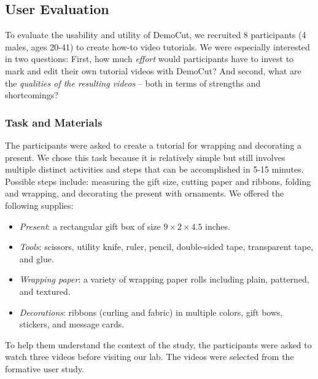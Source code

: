\subsection{User Evaluation}

To evaluate the usability and utility of DemoCut, we recruited 8 participants (4 males, ages 20-41) to create how-to video tutorials.
We were especially interested in two questions: First, how much {\em effort} would participants have to invest to mark and edit their own tutorial videos with DemoCut? And second, what are the {\em qualities of the resulting videos} -- both in terms of strengths and shortcomings?

\subsubsection{Task and Materials}
The participants were asked to create a tutorial for wrapping and decorating a present. We chose this task because it is relatively simple but still involves multiple distinct activities and steps that can be accomplished in 5-15 minutes. Possible steps include: measuring the gift size, cutting paper and ribbons, folding and wrapping, and decorating the present with ornaments.
We offered the following supplies:
\begin{itemize}
  \item \emph{Present}: a rectangular gift box of size $9 \times 2 \times 4.5$ inches.
  \item \emph{Tools}: scissors, utility knife, ruler, pencil, double-sided tape, transparent tape, and glue.
  \item \emph{Wrapping paper}: a variety of wrapping paper rolls including plain, patterned, and textured.
  \item \emph{Decorations}: ribbons (curling and fabric) in multiple colors, gift bows, stickers, and message cards.
\end{itemize}
To help them understand the context of the study, the participants were asked to watch three videos before visiting our lab. The videos were selected from the formative user study.

